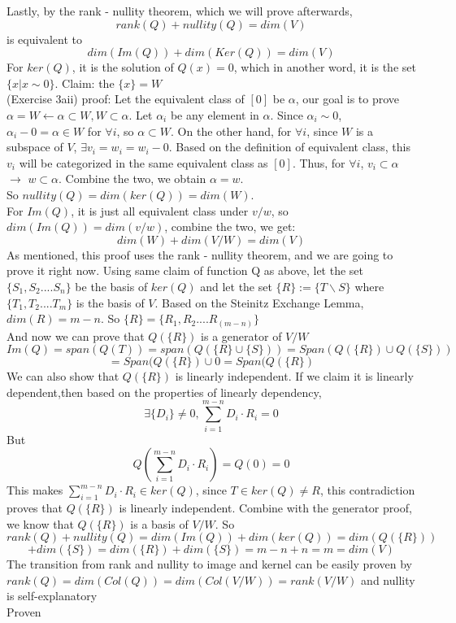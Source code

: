 \documentclass[12pt,letterpaper]{article}
\begin{document}
\begin{normalsize}
{{Lastly, by the rank - nullity theorem, which we will prove afterwards, 
$$rank(Q) + nullity(Q) = dim (V)$$
is equivalent to 
$$dim(Im(Q)) + dim(Ker(Q)) = dim (V)$$
For $ker(Q)$, it is the solution of $Q(x)=0$, which in another word, it is the set $ \{ x | x \sim 0 \} $. Claim: the $\{ x \}= W$ \\
(Exercise 3aii) proof: Let the equivalent class of $[0]$ be $\alpha$, our goal is to prove $\alpha=W \leftarrow \alpha \subset W,W \subset \alpha$. Let $\alpha_i$ be any element in $\alpha$. Since $\alpha_i \sim 0$, $\alpha_i-0=\alpha\in W$ for $\forall i$, so $\alpha \subset W$. On the other hand, for $\forall i$, since $W$ is a subspace of $V$, $\exists v_i=w_i=w_i-0$. Based on the definition of equivalent class, this $v_i$ will be categorized in the same equivalent class as $[0]$. Thus, for $\forall i$, $v_i \subset \alpha$ $\longrightarrow$  $w \subset \alpha$. Combine the two, we obtain $\alpha=w$. \\  So $nullity(Q)=dim(ker(Q))=dim (W)$. \\[5pt]
For $Im(Q)$, it is just all equivalent class under $v/w$, so $dim(Im(Q))=dim(v/w)$, combine the two, we get:
$$dim(W)+dim(V/W)=dim(V)$$
As mentioned, this proof uses the rank - nullity theorem, and we are going to prove it right now.
Using same claim of function Q as above, let the set $\{S_1,S_2....S_n\}$ be the basis of $ker(Q)$ and let the set $\{R\}:=\{T\backslash S\}$ where $\{T_1,T_2....T_m\}$ is the basis of $V$. Based on the Steinitz Exchange Lemma, $dim(R)=m-n$. So $\{R\} =\{R_1,R_2....R_(m-n)\}$ \\[5pt]
And now we can prove that $Q(\{R\})$ is a generator of $V/W$
$$Im(Q)=span(Q(T))=span(Q(\{R\}\cup\{S\}))=Span(Q(\{R\})\cup Q(\{S\}))$$
$$=Span(Q(\{R\})\cup {0}=Span(Q(\{R\}) $$
We can also show that $Q(\{R\})$ is linearly independent. If we claim it is linearly dependent,then based on the properties of linearly dependency,
$$\exists\{D_i\}\ne 0,\sum_{i=1}^{m-n}D_i \cdot R_i=0$$
But $$Q(\sum_{i=1}^{m-n}D_i \cdot R_i)=Q(0)=0$$
This makes $\sum_{i=1}^{m-n}D_i \cdot R_i \in ker(Q)$, since $T\in ker(Q) \ne R$, this contradiction proves that $Q(\{R\})$ is linearly independent. Combine with the generator proof, we know that $Q(\{R\})$ is a basis of $V/W$. So 
$$rank(Q)+nullity(Q)=dim(Im(Q))+dim(ker(Q))=dim(Q(\{R\}))$$
$$+dim(\{S\})=dim(\{R\})+dim(\{S\})=m-n+n=m=dim(V)$$
The transition from rank and nullity to image and kernel can be easily proven by$rank(Q)=dim(Col(Q))=dim(Col(V/W))=rank(V/W)$ and nullity is self-explanatory \\
Proven
}
}




\end{normalsize}
\end{document}
